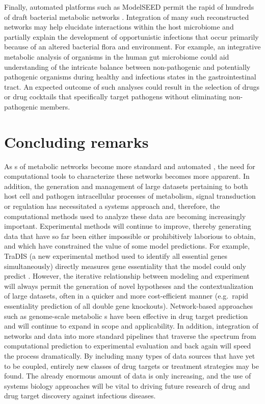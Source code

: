 Finally, automated  platforms such as ModelSEED 
permit the rapid  of hundreds of draft bacterial 
metabolic networks \cite{Overbeek:2005dv,Aziz:2008ku}. Integration of many such reconstructed 
networks may help elucidate interactions within the host 
microbiome and partially explain the development of opportunistic 
infections that occur primarily because of an altered bacterial 
flora and environment. For example, an integrative metabolic 
analysis of organisms in the human gut microbiome could aid 
understanding of the intricate balance between non-pathogenic 
and potentially pathogenic organisms during healthy and 
infectious states in the gastrointestinal tract. An expected 
outcome of such analyses could result in the selection of 
drugs or drug cocktails that specifically target pathogens 
without eliminating non-pathogenic members.

\section{Concluding remarks}
As s of metabolic networks become more standard 
and automated \cite{Thiele:2010fr}, the need for computational tools to characterize 
these networks becomes more apparent. In addition, the generation 
and management of large datasets pertaining to both host cell 
and pathogen intracellular processes of metabolism, signal 
transduction or regulation has necessitated a systems approach 
and, therefore, the computational methods used to analyze 
these data are becoming increasingly important. 
Experimental methods will continue to improve, thereby 
generating data that have so far been either impossible 
or prohibitively laborious to obtain, and which have 
constrained the value of some model predictions. For 
example, TraDIS (a new experimental method used to 
identify all essential genes simultaneously) directly 
measures gene essentiality that the model could only 
predict \cite{Langridge:2009ip}. However, the iterative relationship between 
modeling and experiment will always permit the generation 
of novel hypotheses and the contextualization of large 
datasets, often in a quicker and more cost-efficient 
manner (e.g.\ rapid essentiality prediction of all double 
gene knockouts). Network-based approaches such as 
genome-scale metabolic s have been effective 
in drug target prediction and will continue to expand 
in scope and applicability. In addition, integration 
of networks and data into more standard pipelines that 
traverse the spectrum from computational prediction to 
experimental evaluation and back again will speed the 
process dramatically. By including many types of data 
sources that have yet to be coupled, entirely new classes 
of drug targets or treatment strategies may be found. The 
already enormous amount of data is only increasing, and the 
use of systems biology approaches will be vital to driving 
future research of drug and drug target discovery against 
infectious diseases.

